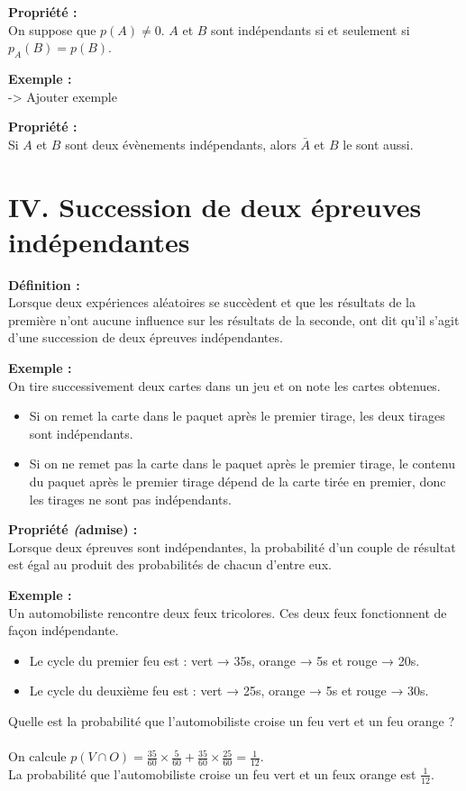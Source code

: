 \documentclass[11pt,a4paper]{article}
\begin{document}
\begin{mdframed}[style=proprieteStyle]
  \textbf{Propriété :} ~\\
  On suppose que $p(A)\not=0$. $A$ et $B$ sont indépendants si et seulement si $p_A(B)=p(B)$.
\end{mdframed}

\textbf{Exemple :} ~\\
-> Ajouter exemple

\begin{mdframed}[style=proprieteStyle]
  \textbf{Propriété :} ~\\
  Si $A$ et $B$ sont deux évènements indépendants, alors $\bar A$ et $B$ le sont aussi.
\end{mdframed}

\section*{IV. Succession de deux épreuves indépendantes}

\begin{mdframed}[style=definitionStyle]
  \textbf{Définition :} ~\\
  Lorsque deux expériences aléatoires se succèdent et que les résultats de la première n'ont aucune influence sur les résultats de la seconde, ont dit qu'il s'agit d'une succession de deux épreuves indépendantes.
\end{mdframed}

\textbf{Exemple :} ~\\
On tire successivement deux cartes dans un jeu et on note les cartes obtenues.
\begin{itemize}
  \item Si on remet la carte dans le paquet après le premier tirage, les deux tirages sont indépendants.
  \item Si on ne remet pas la carte dans le paquet après le premier tirage, le contenu du paquet après le premier tirage dépend de la carte tirée en premier, donc les tirages ne sont pas indépendants.
\end{itemize}

\begin{mdframed}[style=proprieteStyle]
  \textbf{Propriété \emph(admise) :} ~\\
  Lorsque deux épreuves sont indépendantes, la probabilité d'un couple de résultat est égal au produit des probabilités de chacun d'entre eux.
\end{mdframed}

\textbf{Exemple :} ~\\
Un automobiliste rencontre deux feux tricolores. Ces deux feux fonctionnent de façon indépendante.
\begin{itemize}
  \item Le cycle du premier feu est : vert → 35s, orange → 5s et rouge → 20s.
  \item Le cycle du deuxième feu est : vert → 25s, orange → 5s et rouge → 30s.
\end{itemize}
Quelle est la probabilité que l'automobiliste croise un feu vert et un feu orange ? ~\\

On calcule $\displaystyle{}p(V\cap O)=\frac{35}{60}\times\frac{5}{60}+\frac{35}{60}\times\frac{25}{60}=\frac{1}{12}$.\\
La probabilité que l'automobiliste croise un feu vert et un feux orange est $\displaystyle{}\frac{1}{12}$.
\end{document}
